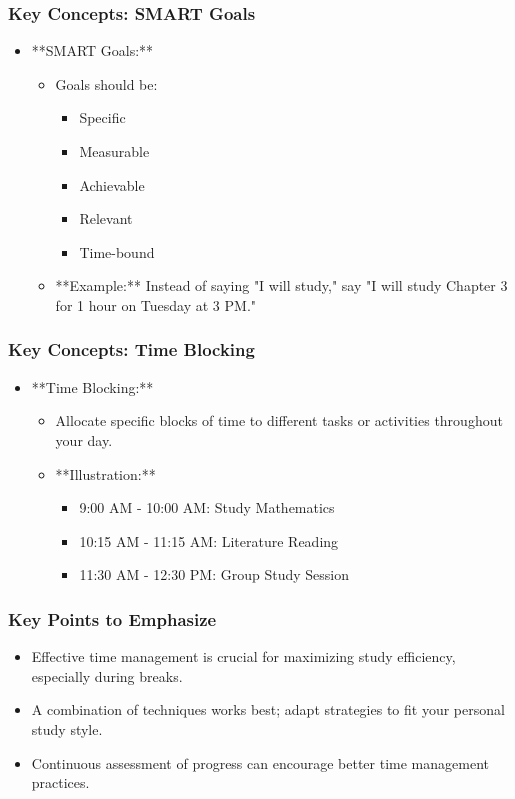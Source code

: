 \documentclass[aspectratio=169]{beamer}
\begin{document}
\begin{frame}[fragile]
    \frametitle{Key Concepts: SMART Goals}
    \begin{itemize}
        \item **SMART Goals:**
        \begin{itemize}
            \item Goals should be: 
            \begin{itemize}
                \item Specific
                \item Measurable
                \item Achievable
                \item Relevant
                \item Time-bound
            \end{itemize}
            \item **Example:** Instead of saying "I will study," say "I will study Chapter 3 for 1 hour on Tuesday at 3 PM."
        \end{itemize}
    \end{itemize}
\end{frame}

\begin{frame}[fragile]
    \frametitle{Key Concepts: Time Blocking}
    \begin{itemize}
        \item **Time Blocking:**
        \begin{itemize}
            \item Allocate specific blocks of time to different tasks or activities throughout your day. 
            \item **Illustration:**
            \begin{itemize}
                \item 9:00 AM - 10:00 AM: Study Mathematics
                \item 10:15 AM - 11:15 AM: Literature Reading
                \item 11:30 AM - 12:30 PM: Group Study Session
            \end{itemize}
        \end{itemize}
    \end{itemize}
\end{frame}

\begin{frame}[fragile]
    \frametitle{Key Points to Emphasize}
    \begin{itemize}
        \item Effective time management is crucial for maximizing study efficiency, especially during breaks.
        \item A combination of techniques works best; adapt strategies to fit your personal study style.
        \item Continuous assessment of progress can encourage better time management practices.
    \end{itemize}
\end{frame}
\end{document}
